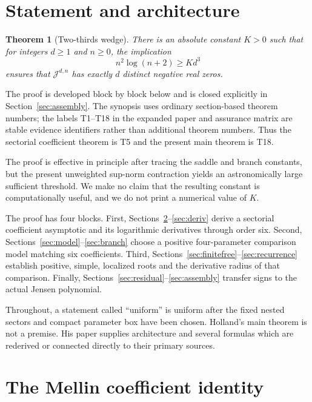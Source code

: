 \documentclass[11pt]{article}
\newtheorem{theorem}{Theorem}[section]
\theoremstyle{definition}
\theoremstyle{remark}
\newcommand{\J}{\mathcal J}
\begin{document}
\section{Statement and architecture}

\begin{theorem}[Two-thirds wedge]\label{thm:main}
There is an absolute constant $K>0$ such that for integers $d\ge1$ and
$n\ge0$, the implication
\[
             n^2\log(n+2)\ge Kd^3
\]
ensures that $\J^{d,n}$ has exactly $d$ distinct negative real zeros.
\end{theorem}

The proof is developed block by block below and is closed explicitly in
Section~\ref{sec:assembly}.  The synopsis uses ordinary section-based theorem
numbers; the labels T1--T18 in the expanded paper and assurance matrix are
stable evidence identifiers rather than additional theorem numbers.  Thus
the sectorial coefficient theorem is T5 and the present main theorem is T18.

The proof is effective in principle after tracing the saddle and branch
constants, but the present unweighted sup-norm contraction yields an
astronomically large sufficient threshold.  We make no claim that the
resulting constant is computationally useful, and we do not print a
numerical value of $K$.

The proof has four blocks.  First, Sections~\ref{sec:mellin}--\ref{sec:deriv}
derive a sectorial coefficient asymptotic and its logarithmic derivatives
through order six.  Second, Sections~\ref{sec:model}--\ref{sec:branch} choose
a positive four-parameter comparison model matching six coefficients.
Third, Sections~\ref{sec:finitefree}--\ref{sec:recurrence} establish positive,
simple, localized roots and the derivative radius of that comparison.
Finally, Sections~\ref{sec:residual}--\ref{sec:assembly} transfer signs to the
actual Jensen polynomial.

Throughout, a statement called ``uniform'' is uniform after the fixed
nested sectors and compact parameter box have been chosen.  Holland's main
theorem is not a premise.  His paper supplies architecture and several
formulas which are rederived or connected directly to their primary
sources.

\section{The Mellin coefficient identity}\label{sec:mellin}
\end{document}
